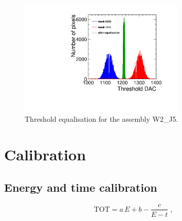 \begin{figure}[htbp] 
  \centering
  \includegraphics[width=0.7\textwidth]{./figures/Calibration/THLequalisation_W2_J5.pdf}
  \caption{Threshold equalisation for the assembly W2\_J5.}
  \label{fig:THLequalisation}
\end{figure}

\section{Calibration} \label{sec:calibration}
\subsection{Energy and time
  calibration} \label{sec:TOT_TOA_calibration}
\begin{equation}
  \text{TOT} = a \, E + b - \frac{c}{E - t} \; ,
  \label{eq:TOTsurrogateFunction}
\end{equation}

